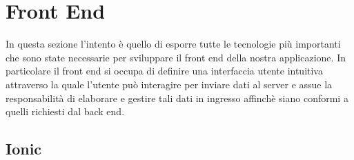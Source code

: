 \chapter{Front End}\label{ch:frontend}

In questa sezione l'intento è quello di esporre tutte le tecnologie più importanti che sono state necessarie per sviluppare il front end della nostra applicazione. In particolare il front end si occupa di definire una interfaccia utente intuitiva attraverso la quale l'utente può interagire per inviare dati al server e assue la responsabilità di elaborare e gestire tali dati in ingresso affinchè siano conformi a quelli richiesti dal back end.

\section{Ionic}

